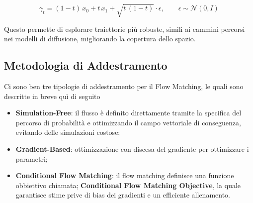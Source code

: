 \begin{equation}
    \gamma_t = (1-t)\,x_0 + t\,x_1 + \sqrt{t\,(1-t)}\cdot\epsilon, \qquad \epsilon\sim\mathcal{N}(0,I)
\end{equation}

Questo permette di esplorare traiettorie più robuste, simili ai cammini percorsi nei modelli di diffusione, migliorando la copertura dello spazio.

\subsection{Metodologia di Addestramento}
Ci sono ben tre tipologie di addestramento per il Flow Matching, le quali sono descritte in breve quì di seguito
\begin{itemize}
    \item \textbf{Simulation-Free}: il flusso è definito direttamente tramite la specifica del percorso di probabilità e ottimizzando il campo vettoriale di conseguenza, evitando delle simulazioni costose;
    \item \textbf{Gradient-Based}: ottimizzazione con discesa del gradiente per ottimizzare i parametri;
    \item \textbf{Conditional Flow Matching}: il flow matching definisce una funzione obbiettivo chiamata; \textbf{Conditional Flow Matching Objective}, la quale garantisce stime prive di bias dei gradienti e un efficiente allenamento.
\end{itemize}

